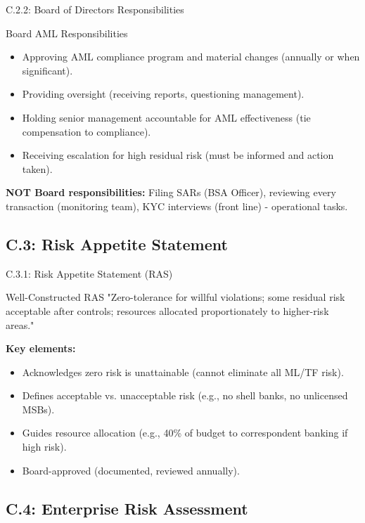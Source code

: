 \documentclass{beamer}
\begin{document}
	\begin{frame}{C.2.2: Board of Directors Responsibilities}
		\begin{block}{Board AML Responsibilities}
			\begin{itemize}
				\item Approving AML compliance program and material changes (annually or when significant).
				\item Providing oversight (receiving reports, questioning management).
				\item Holding senior management accountable for AML effectiveness (tie compensation to compliance).
				\item Receiving escalation for high residual risk (must be informed and action taken).
			\end{itemize}
		\end{block}
		\textbf{NOT Board responsibilities:} Filing SARs (BSA Officer), reviewing every transaction (monitoring team), KYC interviews (front line) - operational tasks.
	\end{frame}
	
	\subsection{C.3: Risk Appetite Statement}
	
	\begin{frame}{C.3.1: Risk Appetite Statement (RAS)}
		\begin{block}{Well-Constructed RAS}
			"Zero-tolerance for willful violations; some residual risk acceptable after controls; resources allocated proportionately to higher-risk areas."
		\end{block}
		\textbf{Key elements:}
		\begin{itemize}
			\item Acknowledges zero risk is unattainable (cannot eliminate all ML/TF risk).
			\item Defines acceptable vs. unacceptable risk (e.g., no shell banks, no unlicensed MSBs).
			\item Guides resource allocation (e.g., 40\% of budget to correspondent banking if high risk).
			\item Board-approved (documented, reviewed annually).
		\end{itemize}
	\end{frame}
	
	\subsection{C.4: Enterprise Risk Assessment}
	
\end{document}
